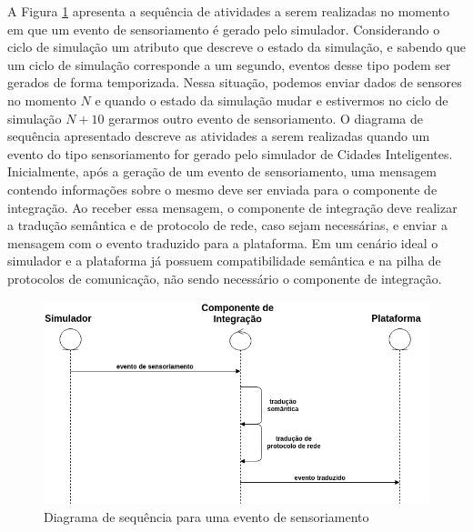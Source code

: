 A Figura \ref{fig:sequencia_eventos_sensores} apresenta a sequência de atividades a serem realizadas no momento em que um evento de sensoriamento é gerado pelo simulador.
Considerando o ciclo de simulação um atributo que descreve o estado da simulação, e sabendo que um ciclo de simulação corresponde a um segundo, eventos desse tipo podem ser gerados de forma temporizada.
Nessa situação, podemos enviar dados de sensores no momento $ N $ e quando o estado da simulação mudar e estivermos no ciclo de simulação $ N + 10 $ gerarmos outro evento de sensoriamento.
O diagrama de sequência apresentado descreve as atividades a serem realizadas quando um evento do tipo sensoriamento for gerado pelo simulador de Cidades Inteligentes.
Inicialmente, após a geração de um evento de sensoriamento, uma mensagem contendo informações sobre o mesmo deve ser enviada para o componente de integração.
Ao receber essa mensagem, o componente de integração deve realizar a tradução semântica e de protocolo de rede, caso sejam necessárias, e enviar a mensagem com o evento traduzido para a plataforma.
Em um cenário ideal o simulador e a plataforma já possuem compatibilidade semântica e na pilha de protocolos de comunicação, não sendo necessário o componente de integração.

\begin{figure}[ht]
	\centering
	\includegraphics[width=\textwidth]{figuras/sequencia_eventos_sensores.png}
	\caption{Diagrama de sequência para uma evento de sensoriamento}
	\label{fig:sequencia_eventos_sensores}
\end{figure}

